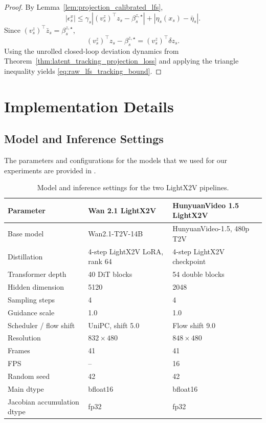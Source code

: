 \documentclass{article}
\begin{document}
\begin{proof}
By Lemma~\ref{lem:projection_calibrated_lfs},
\[
    |\epsilon^x_s|
    \le
    \gamma_s
    \left|
    (v^z_s)^\top z_s-\beta^{z,\star}_s
    \right|
    +
    |\eta_s(x_s)-\bar\eta_s|.
\]
Since $(v^z_s)^\top \bar z_s=\beta^{z,\star}_s$,
\[
    (v^z_s)^\top z_s-\beta^{z,\star}_s
    =
    (v^z_s)^\top \delta z_s.
\]
Using the unrolled closed-loop deviation dynamics from
Theorem~\ref{thm:latent_tracking_projection_loss} and applying the
triangle inequality yields \eqref{eq:raw_lfs_tracking_bound}.
\end{proof}



\section{Implementation Details}\label{app:implementation}

\subsection{Model and Inference Settings}
The parameters and configurations for the models that we used for our experiments are provided in . 
\begin{table}[h]
\centering
\caption{Model and inference settings for the two LightX2V pipelines.}
\label{tab:model_inference_settings}
\begin{tabular}{lll}
\hline
\textbf{Parameter} & \textbf{Wan 2.1 LightX2V} & \textbf{HunyuanVideo 1.5 LightX2V} \\
\hline
Base model & Wan2.1-T2V-14B & HunyuanVideo-1.5, 480p T2V \\
Distillation & 4-step LightX2V LoRA, rank 64 & 4-step LightX2V checkpoint \\
Transformer depth & 40 DiT blocks & 54 double blocks \\
Hidden dimension & 5120 & 2048 \\
Sampling steps & 4 & 4 \\
Guidance scale & 1.0 & 1.0 \\
Scheduler / flow shift & UniPC, shift 5.0 & Flow shift 9.0 \\
Resolution & $832 \times 480$ & $848 \times 480$ \\
Frames & 41 & 41 \\
FPS & -- & 16 \\
Random seed & 42 & 42 \\
Main dtype & bfloat16 & bfloat16 \\
Jacobian accumulation dtype & fp32 & fp32 \\
\hline
\end{tabular}
\end{table}
\end{document}
